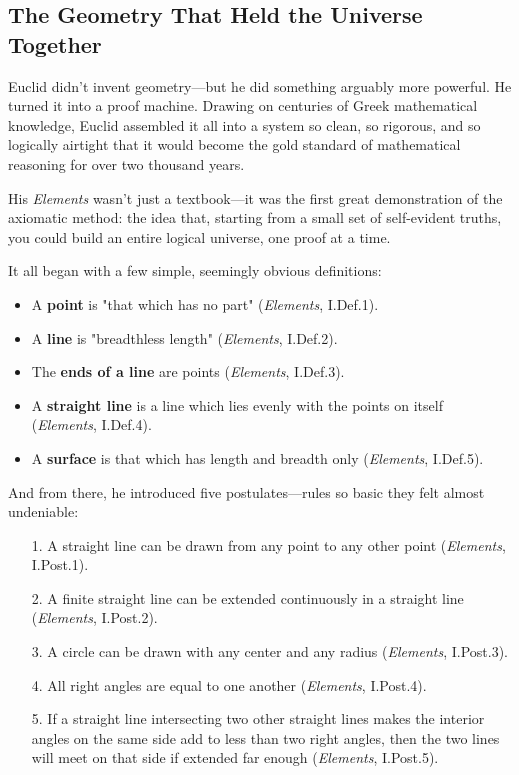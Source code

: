 \subsection{The Geometry That Held the Universe Together}

Euclid didn’t invent geometry—but he did something arguably more powerful. He turned it into a proof machine. Drawing on centuries of Greek mathematical knowledge, Euclid assembled it all into a system so clean, so rigorous, and so logically airtight that it would become the gold standard of mathematical reasoning for over two thousand years.

His \textit{Elements} wasn’t just a textbook—it was the first great demonstration of the axiomatic method: the idea that, starting from a small set of self-evident truths, you could build an entire logical universe, one proof at a time.

It all began with a few simple, seemingly obvious definitions:

\begin{itemize}
    \item A \textbf{point} is "that which has no part" (\textit{Elements}, I.Def.1).
    \item A \textbf{line} is "breadthless length" (\textit{Elements}, I.Def.2).
    \item The \textbf{ends of a line} are points (\textit{Elements}, I.Def.3).
    \item A \textbf{straight line} is a line which lies evenly with the points on itself (\textit{Elements}, I.Def.4).
    \item A \textbf{surface} is that which has length and breadth only (\textit{Elements}, I.Def.5).
\end{itemize}

And from there, he introduced five postulates—rules so basic they felt almost undeniable:

\begin{itemize}
    \item[1.] A straight line can be drawn from any point to any other point (\textit{Elements}, I.Post.1).
    \item[2.] A finite straight line can be extended continuously in a straight line (\textit{Elements}, I.Post.2).
    \item[3.] A circle can be drawn with any center and any radius (\textit{Elements}, I.Post.3).
    \item[4.] All right angles are equal to one another (\textit{Elements}, I.Post.4).
    \item[5.] If a straight line intersecting two other straight lines makes the interior angles on the same side add to less than two right angles, then the two lines will meet on that side if extended far enough (\textit{Elements}, I.Post.5).
\end{itemize}


